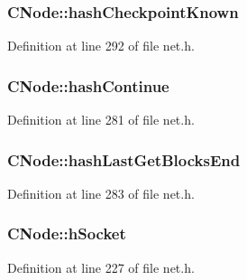 \hypertarget{class_c_node_af1b7e1316a44a8ed4995413366ed6b8a}{}
\subsubsection[{hash\+Checkpoint\+Known}]{ C\+Node\+::hash\+Checkpoint\+Known}\label{class_c_node_af1b7e1316a44a8ed4995413366ed6b8a}


Definition at line 292 of file net.\+h.

\hypertarget{class_c_node_a1a1c0d94de0197c5c4abf5a8d13364f3}{}
\subsubsection[{hash\+Continue}]{ C\+Node\+::hash\+Continue}\label{class_c_node_a1a1c0d94de0197c5c4abf5a8d13364f3}


Definition at line 281 of file net.\+h.

\hypertarget{class_c_node_a00f1eb04110387df966dd9c3ff3c53fb}{}
\subsubsection[{hash\+Last\+Get\+Blocks\+End}]{ C\+Node\+::hash\+Last\+Get\+Blocks\+End}\label{class_c_node_a00f1eb04110387df966dd9c3ff3c53fb}


Definition at line 283 of file net.\+h.

\hypertarget{class_c_node_a7cda6efa6a9ef9db3eebe70fc3bdd45a}{}
\subsubsection[{h\+Socket}]{ C\+Node\+::h\+Socket}\label{class_c_node_a7cda6efa6a9ef9db3eebe70fc3bdd45a}


Definition at line 227 of file net.\+h.

